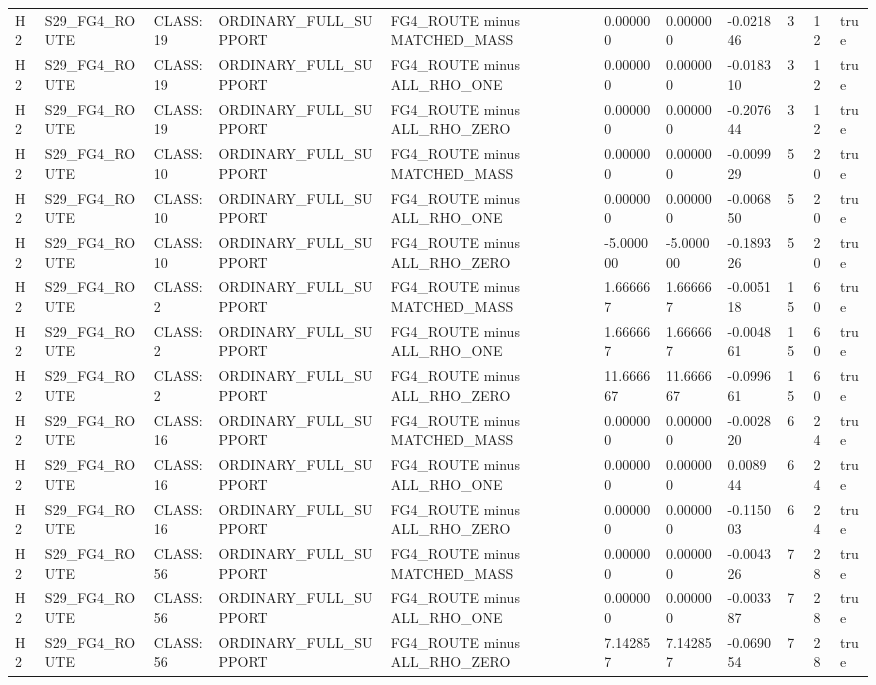 \begin{tabular}{lllllllllll}
H2 & S29\_FG4\_ROUTE & CLASS:19 & ORDINARY\_FULL\_SUPPORT & FG4\_ROUTE minus MATCHED\_MASS & 0.000000 & 0.000000 & -0.021846 & 3 & 12 & true \\
H2 & S29\_FG4\_ROUTE & CLASS:19 & ORDINARY\_FULL\_SUPPORT & FG4\_ROUTE minus ALL\_RHO\_ONE & 0.000000 & 0.000000 & -0.018310 & 3 & 12 & true \\
H2 & S29\_FG4\_ROUTE & CLASS:19 & ORDINARY\_FULL\_SUPPORT & FG4\_ROUTE minus ALL\_RHO\_ZERO & 0.000000 & 0.000000 & -0.207644 & 3 & 12 & true \\
H2 & S29\_FG4\_ROUTE & CLASS:10 & ORDINARY\_FULL\_SUPPORT & FG4\_ROUTE minus MATCHED\_MASS & 0.000000 & 0.000000 & -0.009929 & 5 & 20 & true \\
H2 & S29\_FG4\_ROUTE & CLASS:10 & ORDINARY\_FULL\_SUPPORT & FG4\_ROUTE minus ALL\_RHO\_ONE & 0.000000 & 0.000000 & -0.006850 & 5 & 20 & true \\
H2 & S29\_FG4\_ROUTE & CLASS:10 & ORDINARY\_FULL\_SUPPORT & FG4\_ROUTE minus ALL\_RHO\_ZERO & -5.000000 & -5.000000 & -0.189326 & 5 & 20 & true \\
H2 & S29\_FG4\_ROUTE & CLASS:2 & ORDINARY\_FULL\_SUPPORT & FG4\_ROUTE minus MATCHED\_MASS & 1.666667 & 1.666667 & -0.005118 & 15 & 60 & true \\
H2 & S29\_FG4\_ROUTE & CLASS:2 & ORDINARY\_FULL\_SUPPORT & FG4\_ROUTE minus ALL\_RHO\_ONE & 1.666667 & 1.666667 & -0.004861 & 15 & 60 & true \\
H2 & S29\_FG4\_ROUTE & CLASS:2 & ORDINARY\_FULL\_SUPPORT & FG4\_ROUTE minus ALL\_RHO\_ZERO & 11.666667 & 11.666667 & -0.099661 & 15 & 60 & true \\
H2 & S29\_FG4\_ROUTE & CLASS:16 & ORDINARY\_FULL\_SUPPORT & FG4\_ROUTE minus MATCHED\_MASS & 0.000000 & 0.000000 & -0.002820 & 6 & 24 & true \\
H2 & S29\_FG4\_ROUTE & CLASS:16 & ORDINARY\_FULL\_SUPPORT & FG4\_ROUTE minus ALL\_RHO\_ONE & 0.000000 & 0.000000 & 0.008944 & 6 & 24 & true \\
H2 & S29\_FG4\_ROUTE & CLASS:16 & ORDINARY\_FULL\_SUPPORT & FG4\_ROUTE minus ALL\_RHO\_ZERO & 0.000000 & 0.000000 & -0.115003 & 6 & 24 & true \\
H2 & S29\_FG4\_ROUTE & CLASS:56 & ORDINARY\_FULL\_SUPPORT & FG4\_ROUTE minus MATCHED\_MASS & 0.000000 & 0.000000 & -0.004326 & 7 & 28 & true \\
H2 & S29\_FG4\_ROUTE & CLASS:56 & ORDINARY\_FULL\_SUPPORT & FG4\_ROUTE minus ALL\_RHO\_ONE & 0.000000 & 0.000000 & -0.003387 & 7 & 28 & true \\
H2 & S29\_FG4\_ROUTE & CLASS:56 & ORDINARY\_FULL\_SUPPORT & FG4\_ROUTE minus ALL\_RHO\_ZERO & 7.142857 & 7.142857 & -0.069054 & 7 & 28 & true \\

\end{tabular}
